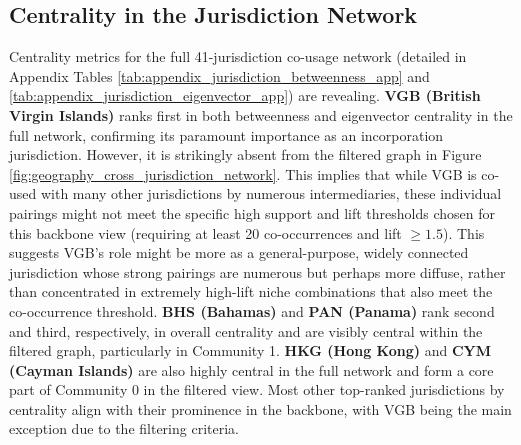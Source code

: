 \subsection{Centrality in the Jurisdiction Network}
Centrality metrics for the full 41-jurisdiction co-usage network (detailed in Appendix Tables \ref{tab:appendix_jurisdiction_betweenness_app} and \ref{tab:appendix_jurisdiction_eigenvector_app}) are revealing.
\textbf{VGB (British Virgin Islands)} ranks first in both betweenness and eigenvector centrality in the full network, confirming its paramount importance as an incorporation jurisdiction. However, it is strikingly absent from the filtered graph in Figure \ref{fig:geography_cross_jurisdiction_network}. This implies that while VGB is co-used with many other jurisdictions by numerous intermediaries, these individual pairings might not meet the specific high support and lift thresholds chosen for this backbone view (requiring at least 20 co-occurrences and lift $\ge 1.5$). This suggests VGB's role might be more as a general-purpose, widely connected jurisdiction whose strong pairings are numerous but perhaps more diffuse, rather than concentrated in extremely high-lift niche combinations that also meet the co-occurrence threshold.
\textbf{BHS (Bahamas)} and \textbf{PAN (Panama)} rank second and third, respectively, in overall centrality and are visibly central within the filtered graph, particularly in Community 1. \textbf{HKG (Hong Kong)} and \textbf{CYM (Cayman Islands)} are also highly central in the full network and form a core part of Community 0 in the filtered view. Most other top-ranked jurisdictions by centrality align with their prominence in the backbone, with VGB being the main exception due to the filtering criteria.

